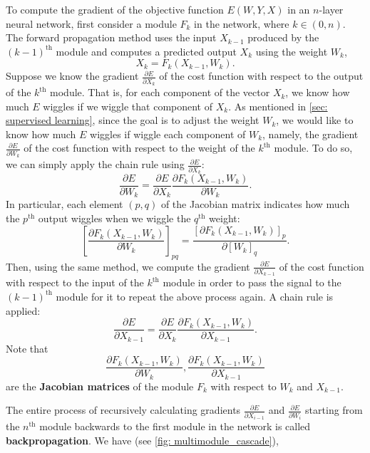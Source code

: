 To compute the gradient of the objective function $E(W,Y,X)$ in an $n$-layer neural network, first consider a module $F_k$ in the network, where $k\in (0, n)$.
The forward propagation method uses the input $X_{k-1}$ produced by the $(k-1)^{\text{th}}$ module and computes a predicted output $X_k$ using the weight $W_k$, 
\[ X_k=F_k(X_{k-1},W_k). \]
Suppose we know the gradient $\frac{\partial E}{\partial X_k}$ of the cost function with respect to the output of the $k^\text{th}$ module.
That is, for each component of the vector $X_k$, we know how much $E$ wiggles if we wiggle that component of $X_k$.
As mentioned in \cref{sec: supervised learning}, since the goal is to adjust the weight $W_k$, we would like to know how much $E$ wiggles if wiggle each component of $W_k$, namely, the gradient $\frac{\partial E}{\partial W_k}$ of the cost function with respect to the weight of the $k^\text{th}$ module.
To do so, we can simply apply the chain rule using $\frac{\partial E}{\partial X_k}$: 
\[
\frac{\partial E}{\partial W_k} = \frac{\partial E}{\partial X_k} \frac{\partial F_k(X_{k-1},W_k)}{\partial W_k}.
\]
In particular, each element $(p,q)$ of the Jacobian matrix indicates how much the $p^\text{th}$ output wiggles when we wiggle the $q^\text{th}$ weight:
\[
\left[ \frac{\partial F_k(X_{k-1},W_k)}{\partial W_k} \right]_{pq} = \frac{[\partial F_k(X_{k-1},W_k)]_p}{\partial [W_k]_q}.
\]
Then, using the same method, we compute the gradient $\frac{\partial E}{\partial X_{k-1}}$ of the cost function with respect to the input of the $k^\text{th}$ module in order to pass the signal to the $(k-1)^\text{th}$ module for it to repeat the above process again.
A chain rule is applied:
\[
\frac{\partial E}{\partial X_{k-1}} = \frac{\partial E}{\partial X_k} \frac{\partial F_k(X_{k-1},W_k)}{\partial X_{k-1}}.
\]
Note that 
\[
\frac{\partial F_k(X_{k-1},W_k)}{\partial W_k}, \frac{\partial F_k(X_{k-1},W_k)}{\partial X_{k-1}}
\]
are the \textbf{Jacobian matrices} of the module $F_k$ with respect to  $W_k$ and $X_{k-1}$.

The entire process of recursively calculating gradients $\frac{\partial E}{\partial X_{i-1}}$ and $\frac{\partial E}{\partial W_i}$ starting from the $n^\text{th}$ module backwards to the first module in the network is called \textbf{backpropagation}.
We have (see \cref{fig: multimodule_cascade}),


